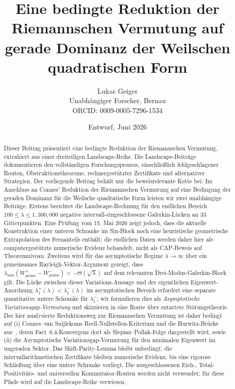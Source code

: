 \documentclass[11pt,a4paper]{article}
\title{Eine bedingte Reduktion der Riemannschen Vermutung auf gerade Dominanz der Weilschen quadratischen Form}
\author{Lukas Geiger\\Unabhängiger Forscher, Bernau\\ORCID: 0009-0005-7296-1534}
\date{Entwurf, Juni 2026}
\theoremstyle{remark}
\theoremstyle{plain}
\begin{document}
\maketitle

\begin{abstract}
Dieser Beitrag präsentiert eine bedingte Reduktion der Riemannschen Vermutung, extrahiert aus einer dreiteiligen Landscape-Reihe. Die Landscape-Beiträge dokumentieren den vollständigen Forschungsprozess, einschließlich fehlgeschlagener Routen, Obstruktionstheoreme, rechnergestützter Zertifikate und alternativer Strategien. Der vorliegende Beitrag behält nur die beweisrelevante Kette bei.
Im Anschluss an Connes' Reduktion der Riemannschen Vermutung auf eine Bedingung der geraden Dominanz für die Weilsche quadratische Form leisten wir zwei unabhängige Beiträge. Erstens berichtet die Landscape-Rechnung für den endlichen Bereich $100\leq\lambda\leq 1{,}300{,}000$ negative intervall-eingeschlossene Galerkin-Lücken an 33 Gitterpunkten. Eine Prüfung vom 15. Mai 2026 zeigt jedoch, dass die aktuelle Konstruktion einer unteren Schranke im Sin-Block noch eine heuristische geometrische Extrapolation des Fernanteils enthält; die endlichen Daten werden daher hier als computergestützte numerische Evidenz behandelt, nicht als CAP-Beweis auf Theoremniveau. Zweitens wird für das asymptotische Regime $\lambda\to\infty$ über ein gemeinsames Rayleigh-Vektor-Argument gezeigt, dass $\lambda_{\min}(W^+_{\mathrm{prime}}-W^-_{\mathrm{prime}})=-\Theta(\sqrt\lambda)$ auf dem relevanten Drei-Modus-Galerkin-Block gilt. Die Lücke zwischen dieser Variations-Aussage und der eigentlichen Eigenwert-Anordnung $\lambda_1^+(\lambda)<\lambda_1^-(\lambda)$ im asymptotischen Bereich erfordert eine separate quantitative untere Schranke für $\lambda_1^-$; wir formulieren dies als \emph{Asymptotische Variationsgap-Vermutung} und skizzieren in  eine Route über entartete Störungstheorie.
Der hier analysierte Reduktionsweg zur Riemannschen Vermutung ist daher bedingt auf (i) Connes--van Suijlekoms Reell-Nullstellen-Kriterium und die Hurwitz-Brücke aus~\cite{Connes2026}, deren Fact~6.4-Konvergenz dort als Slepian--Pollak-Folge dargestellt wird, sowie (ii) die Asymptotische Variationsgap-Vermutung für den minimalen Eigenwert im ungeraden Sektor. Das Shift-Parity-Lemma bleibt unbedingt; die intervallarithmetischen Zertifikate bleiben numerische Evidenz, bis eine rigorose Schließung über eine untere Schranke vorliegt. Die ausgeschlossenen Eich-, Total-Positivitäts- und universellen Kommutator-Routen werden nicht verwendet; für diese Pfade wird auf die Landscape-Reihe verwiesen.
\end{abstract}
\end{document}
